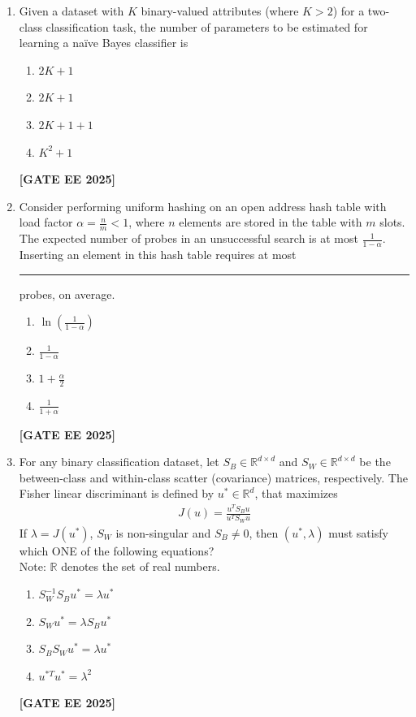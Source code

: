 \documentclass[journal]{IEEEtran}
\newcommand{\qfooter}{%
  \begin{flushright}\footnotesize\textbf{[GATE EE 2025]}\end{flushright}\vspace{1em}%
}
\begin{document}
\begin{enumerate}
\item Given a dataset with $K$ binary-valued attributes (where $K > 2$) for a two-class classification task, the number of parameters to be estimated for learning a na\"ive Bayes classifier is
\begin{multicols}{2}
\begin{enumerate}
\item $2K+1$
\item $2K+1$
\item $2K+1+1$
\item $K^2+1$
\end{enumerate} \qfooter
\end{multicols}


\item Consider performing uniform hashing on an open address hash table with load factor $\alpha = \frac{n}{m} < 1$, where $n$ elements are stored in the table with $m$ slots. The expected number of probes in an unsuccessful search is at most $\frac{1}{1-\alpha}$. Inserting an element in this hash table requires at most \rule{8em}{0.07em} probes, on average.
\begin{multicols}{2}
\begin{enumerate}
\item $\ln\left(\frac{1}{1-\alpha}\right)$
\item $\frac{1}{1-\alpha}$
\item $1+\frac{\alpha}{2}$
\item $\frac{1}{1+\alpha}$
\end{enumerate} \qfooter
\end{multicols}

\item For any binary classification dataset, let $S_B \in \mathbb{R}^{d \times d}$ and $S_W \in \mathbb{R}^{d \times d}$ be the between-class and within-class scatter (covariance) matrices, respectively. The Fisher linear discriminant is defined by $u^* \in \mathbb{R}^d$, that maximizes
\begin{align}
J(u) = \frac{u^T S_B u}{u^T S_W u}
\end{align}
If $\lambda=J(u^*)$, $S_W$ is non-singular and $S_B \neq 0$, then $(u^*, \lambda)$ must satisfy which ONE of the following equations?\\
Note: $\mathbb{R}$ denotes the set of real numbers.
\begin{multicols}{2}
\begin{enumerate}
\item $S_W^{-1} S_B u^* = \lambda u^*$
\item $S_W u^* = \lambda S_B u^*$
\item $S_B S_W u^* = \lambda u^*$
\item $u^{*T} u^* = \lambda^2$
\end{enumerate} \qfooter
\end{multicols}


\end{enumerate}
\end{document}
